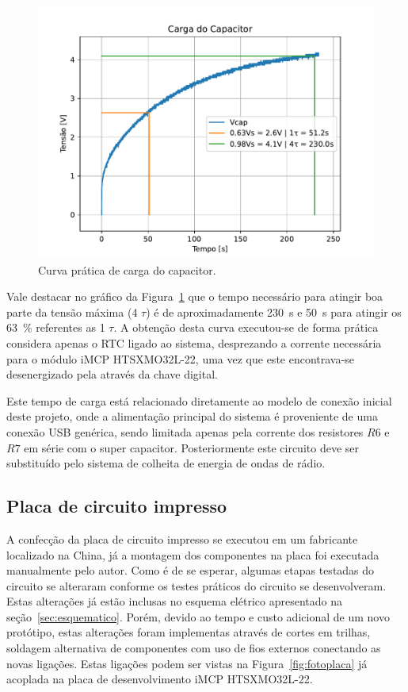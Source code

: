 \begin{figure}
  \caption{Curva prática de carga do capacitor.}
  \begin{center}
      \includegraphics[scale=0.7]{scripts/supercapCarga.csv.pdf}
  \end{center}
  \label{fig:capcargaP}
\end{figure}

Vale destacar no gráfico da Figura~\ref{fig:capcargaP} que o tempo necessário para atingir boa parte da tensão máxima (4 $\tau$) é de aproximadamente 230~s e 50~s para atingir os 63~\% referentes as 1 $\tau$. A obtenção desta curva executou-se de forma prática considera apenas o RTC ligado ao sistema, desprezando a corrente necessária para o módulo iMCP HTSXMO32L-22, uma vez que este encontrava-se desenergizado pela através da chave digital.

Este tempo de carga está relacionado diretamente ao modelo de conexão inicial deste projeto, onde a alimentação principal do sistema é proveniente de uma conexão USB genérica, sendo limitada apenas pela corrente dos resistores $R6$ e $R7$ em série com o super capacitor. Posteriormente este circuito deve ser substituído pelo sistema de colheita de energia de ondas de rádio.
\subsection{Placa de circuito impresso\label{sec:pcb}}
A confecção da placa de circuito impresso se executou em um fabricante localizado na China, já a montagem dos componentes na placa foi executada manualmente pelo autor. Como é de se esperar, algumas etapas testadas do circuito se alteraram conforme os testes práticos do circuito se desenvolveram. Estas alterações já estão inclusas no esquema elétrico apresentado na seção~\ref{sec:esquematico}. Porém, devido ao tempo e custo adicional de um novo protótipo, estas alterações foram implementas através de cortes em trilhas, soldagem alternativa de componentes com uso de fios externos conectando as novas ligações. Estas ligações podem ser vistas na Figura~\ref{fig:fotoplaca} já acoplada na placa de desenvolvimento iMCP HTSXMO32L-22.


